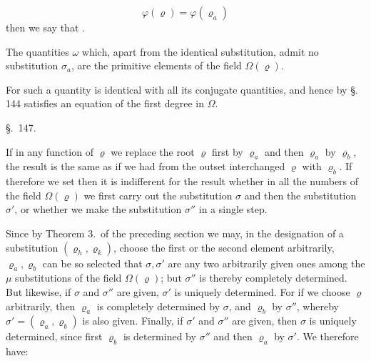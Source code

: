 
\[
\varphi(\varrho) = \varphi(\varrho_a)
\]
then we say that .

The quantities $\omega$ which, apart from the identical substitution, admit no substitution $\sigma_a$, are the primitive elements of the field $\Omega(\varrho)$.


For such a quantity is identical with all its conjugate quantities, and hence by \S.\,144 satisfies an equation of the first degree in $\Omega$.

\begin{center}
\S.\ 147.
\end{center}

\begin{center}
\end{center}

If in any function of $\varrho$ we replace the root $\varrho$ first by $\varrho_a$ and then $\varrho_a$ by $\varrho_b$, the result is the same as if we had from the outset interchanged $\varrho$ with $\varrho_b$. If therefore we set
then it is indifferent for the result whether in all the numbers of the field $\Omega(\varrho)$ we first carry out the substitution $\sigma$ and then the substitution $\sigma'$, or whether we make the substitution $\sigma''$ in a single step.

Since by Theorem 3.\ of the preceding section we may, in the designation of a substitution $(\varrho_h, \varrho_k)$, choose the first or the second element arbitrarily, $\varrho_a, \varrho_b$ can be so selected that $\sigma, \sigma'$ are any two arbitrarily given ones among the $\mu$ substitutions of the field $\Omega(\varrho)$; but $\sigma''$ is thereby completely determined. But likewise, if $\sigma$ and $\sigma''$ are given, $\sigma'$ is uniquely determined. For if we choose $\varrho$ arbitrarily, then $\varrho_a$ is completely determined by $\sigma$, and $\varrho_b$ by $\sigma''$, whereby $\sigma' = (\varrho_a, \varrho_b)$ is also given. Finally, if $\sigma'$ and $\sigma''$ are given, then $\sigma$ is uniquely determined, since first $\varrho_b$ is determined by $\sigma''$ and then $\varrho_a$ by $\sigma'$. We therefore have:

